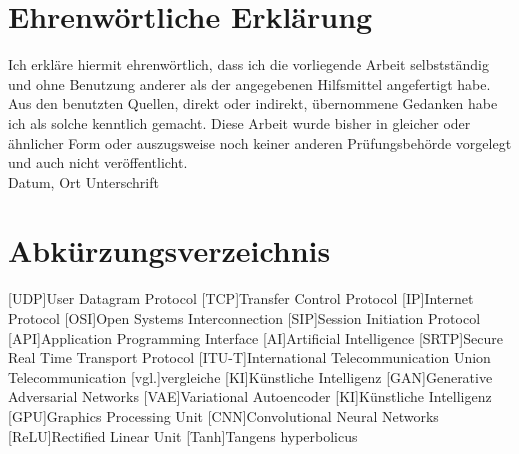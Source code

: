 \documentclass[12pt,a4paper]{article}
\begin{document}
\newpage
\section*{Ehrenwörtliche Erklärung}
	Ich erkläre hiermit ehrenwörtlich, dass ich die vorliegende Arbeit selbstständig und ohne Benutzung anderer als der angegebenen Hilfsmittel angefertigt habe. Aus den benutzten Quellen, direkt oder indirekt, übernommene Gedanken habe ich als solche kenntlich gemacht. Diese Arbeit wurde bisher in gleicher oder ähnlicher Form oder auszugsweise noch keiner anderen Prüfungsbehörde vorgelegt und auch nicht veröffentlicht.
	\vspace{1cm}
	\newline
	\noindent {} \hfill {}\\
	{\noindent \small Datum, Ort \hfill Unterschrift}

\newpage
\tableofcontents

\newpage
\pagestyle{fancy}
\section*{Abkürzungsverzeichnis}
\begin{acronym}
	[UDP]{User Datagram Protocol}
	[TCP]{Transfer Control Protocol}
	[IP]{Internet Protocol}
	[OSI]{Open Systems Interconnection}
	[SIP]{Session Initiation Protocol}
	[API]{Application Programming Interface}
	[AI]{Artificial Intelligence}
	[SRTP]{Secure Real Time Transport Protocol}
	[ITU-T]{International Telecommunication Union Telecommunication}
	[vgl.]{vergleiche}
	[KI]{Künstliche Intelligenz}
	[GAN]{Generative Adversarial Networks}
	[VAE]{Variational Autoencoder}
	[KI]{Künstliche Intelligenz}
	[GPU]{Graphics Processing Unit}
	[CNN]{Convolutional Neural Networks}
	[ReLU]{Rectified Linear Unit}
	[Tanh]{Tangens hyperbolicus}
\end{acronym}
\end{document}
